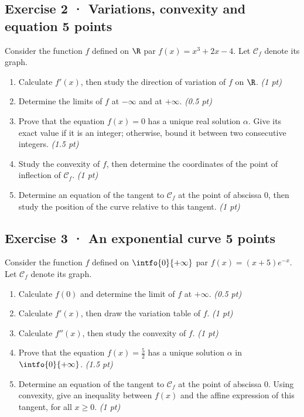 \subsection*{Exercise 2 · Variations, convexity and equation \hfill 5 points}Consider the function $f$ defined on $\R$ par $f(x)=x^3+2x-4$. Let $\mathcal C_f$ denote its graph.

\begin{enumerate}

\item Calculate $f' (x)$, then study the direction of variation of $f$ on $\R$. \hfill\textit{(1 pt)}

\item Determine the limits of $f$ at $-\infty$ and at $+\infty$. \hfill\textit{(0.5 pt)}

\item Prove that the equation $f(x)=0$ has a unique real solution $\alpha$. Give its exact value if it is an integer; otherwise, bound it between two consecutive integers. \hfill\textit{(1.5 pt)}

\item Study the convexity of $f$, then determine the coordinates of the point of inflection of $\mathcal C_f$. \hfill\textit{(1 pt)}

\item Determine an equation of the tangent to $\mathcal C_f$ at the point of abscissa $0$, then study the position of the curve relative to this tangent. \hfill\textit{(1 pt)}

\end{enumerate}

\mxnewpage{}

\subsection*{Exercise 3 · An exponential curve \hfill 5 points}Consider the function $f$ defined on $\intfo{0}{+\infty}$ par $f(x)=(x+5)e^{-x}$. Let $\mathcal C_f$ denote its graph.

\begin{enumerate}

\item Calculate $f(0)$ and determine the limit of $f$ at $+\infty$. \hfill\textit{(0.5 pt)}

\item Calculate $f' (x)$, then draw the variation table of $f$. \hfill\textit{(1 pt)}

\item Calculate $f'' (x)$, then study the convexity of $f$. \hfill\textit{(1 pt)}

\item Prove that the equation $f(x)=\frac{5}{2}$ has a unique solution $\alpha$ in $\intfo{0}{+\infty}$. \hfill\textit{(1.5 pt)}

\item Determine an equation of the tangent to $\mathcal C_f$ at the point of abscissa $0$. Using convexity, give an inequality between $f(x)$ and the affine expression of this tangent, for all $x\ge0$. \hfill\textit{(1 pt)}

\end{enumerate}

